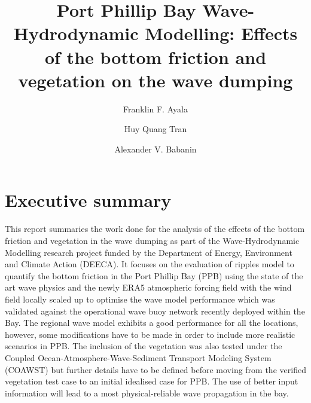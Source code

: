\documentclass[12pt]{article}
\title{\vspace{-2cm} \Large Port Phillip Bay Wave-Hydrodynamic Modelling: Effects of the bottom friction and vegetation on the wave dumping}
\author[1]{\normalsize Franklin F. Ayala}
\author[1]{Huy Quang Tran}
\author[1,*]{Alexander V. Babanin}
\affil[1]{Faculty of Engineering and Information Technology (FEIT), University of Melbourne, Melbourne, VIC 3010, Australia; \href{mailto:a.babanin@unimelb.edu.au}{a.babanin@unimelb.edu.au}}
\begin{document}
\maketitle

\section*{Executive summary}
This report summaries  the work done for the analysis of the effects of the bottom friction and vegetation in the wave dumping as part of the Wave-Hydrodynamic Modelling research project funded by the Department of Energy, Environment and Climate Action (DEECA). It focuses on the evaluation of ripples model to quantify the bottom friction in the Port Phillip Bay (PPB) using the state of the art wave physics and the newly ERA5 atmospheric forcing field with the wind field locally scaled up to optimise the wave model performance which was validated against the operational wave buoy network recently deployed within the Bay. The regional wave model exhibits a good performance for all the locations, however, some modifications have to be made in order to include more realistic scenarios in PPB. The inclusion of the vegetation was also tested under the Coupled Ocean-Atmosphere-Wave-Sediment Transport Modeling System (COAWST) but further details have to be defined before moving from the verified vegetation test case to an initial idealised case for PPB. The use of better input information will lead to a most physical-reliable wave propagation in the bay.\\


\end{document}
